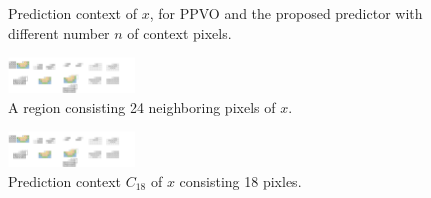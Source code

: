 \documentclass[review,3p,10pt,sort&compress]{elsarticle}
\begin{document}
\begin{figure}
{\begin{minipage}[t]{0.2\linewidth}
    \end{minipage}
}
\qquad\qquad
{}		
\centering
\caption{Prediction context of $x$, for PPVO \cite{Qu2015PPVO} and the proposed predictor with different number $n$ of context pixels.}
\label{Fig.Context}
\end{figure}

\begin{figure}
    \centering
    \includegraphics[width=0.3\textwidth]{figures/C3.pdf}
\centering
\caption{A region consisting 24 neighboring pixels of $x$.}
\label{Fig.Contextofx}
\end{figure}

\begin{figure}
    \centering
    \includegraphics[width=0.3\textwidth]{figures/C4.pdf}
\caption{Prediction context $C_{18}$ of $x$ consisting 18 pixles.}
\label{Fig.Contextx18}
\end{figure}
\end{document}
